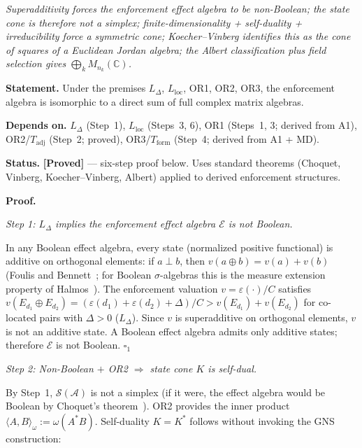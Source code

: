 \documentclass[11pt]{article}
\theoremstyle{remark}
\begin{document}
\begin{tcolorbox}[apfbox, title={Proposition T1-NB (Non-Boolean Bridge): $L_\Delta + L_{\mathrm{loc}} + \mathrm{OR1} + \mathrm{OR2} + \mathrm{OR3} \Rightarrow \mathcal{A} \cong \bigoplus_k M_{n_k}(\mathbb{C})$}]

\textit{Superadditivity forces the enforcement effect algebra to be non-Boolean; the state cone is therefore not a simplex; finite-dimensionality + self-duality + irreducibility force a symmetric cone; Koecher--Vinberg identifies this as the cone of squares of a Euclidean Jordan algebra; the Albert classification plus field selection gives $\bigoplus_k M_{n_k}(\mathbb{C})$.}

\smallskip\noindent\textbf{Statement.}  Under the premises $L_\Delta$, $L_{\mathrm{loc}}$, OR1, OR2, OR3, the enforcement algebra is isomorphic to a direct sum of full complex matrix algebras.

\smallskip\noindent\textbf{Depends on.}  $L_\Delta$ (Step~1), $L_{\mathrm{loc}}$ (Steps~3, 6), OR1 (Steps~1, 3; derived from A1), OR2/$T_{\mathrm{adj}}$ (Step~2; proved), OR3/$T_{\mathrm{form}}$ (Step~4; derived from A1 + MD).

\smallskip\noindent\textbf{Status.}  \textbf{[Proved]} --- six-step proof below.  Uses standard theorems (Choquet, Vinberg, Koecher--Vinberg, Albert) applied to derived enforcement structures.

\smallskip\noindent\textbf{Proof.}

\textit{Step 1: $L_\Delta$ implies the enforcement effect algebra $\mathcal{E}$ is not Boolean.}

In any Boolean effect algebra, every state (normalized positive functional) is additive on orthogonal elements: if $a \perp b$, then $v(a \oplus b) = v(a) + v(b)$ (Foulis and Bennett~\cite{FoulisEA1994}; for Boolean $\sigma$-algebras this is the measure extension property of Halmos~\cite{Halmos1950}).  The enforcement valuation $v = \varepsilon(\cdot)/C$ satisfies $v(E_{d_1} \oplus E_{d_2}) = (\varepsilon(d_1) + \varepsilon(d_2) + \Delta)/C > v(E_{d_1}) + v(E_{d_2})$ for co-located pairs with $\Delta > 0$ ($L_\Delta$).  Since $v$ is superadditive on orthogonal elements, $v$ is not an additive state.  A Boolean effect algebra admits only additive states; therefore $\mathcal{E}$ is not Boolean.  \hfill$\square_1$

\textit{Step 2: Non-Boolean $+$ OR2 $\Rightarrow$ state cone $K$ is self-dual.}

By Step~1, $\mathcal{S}(\mathcal{A})$ is not a simplex (if it were, the effect algebra would be Boolean by Choquet's theorem~\cite{Choquet1956}).  OR2 provides the inner product $\langle A, B \rangle_\omega := \omega(A^*B)$.  Self-duality $K = K^*$ follows without invoking the GNS construction:


\end{tcolorbox}
\end{document}
